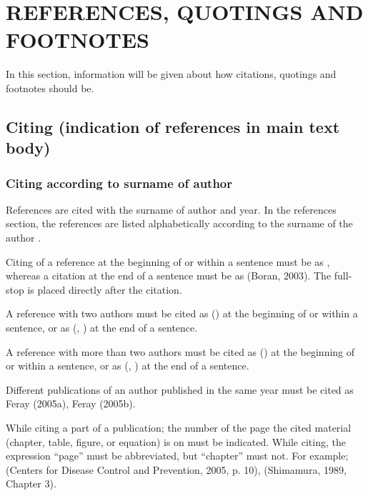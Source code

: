 \chapter{REFERENCES, QUOTINGS AND FOOTNOTES}\label{ch:ch4}

In this section, information will be given about how citations, quotings and footnotes should be.

\section{Citing (indication of references in main text body)}

\vspace{-12pt}

\subsection{Citing according to surname of author}

References are cited with the surname of author and year. In the references section, the references are listed alphabetically according to the surname of the author \citep{acar97}.

Citing of a reference at the beginning of or within a sentence must be as \citet{harper2007}, whereas a citation at the end of a sentence must be as (Boran, 2003). The full-stop is placed directly after the citation. 

A reference with two authors must be cited as \citeauthor{mccaffrey88} (\citeyear{mccaffrey88}) at the beginning of or within a sentence, or as (\citeauthor{mccaffrey88}, \citeyear{mccaffrey88}) at the end of a sentence. 

A reference with more than two authors must be cited as \citeauthor{vanden2001} (\citeyear{vanden2001}) at the beginning of or within a sentence, or as (\citeauthor{vanden2001}, \citeyear{vanden2001}) at the end of a sentence. 

Different publications of an author published in the same year must be cited as Feray (2005a), Feray (2005b).

While citing a part of a publication; the number of the page the cited material (chapter, table, figure, or equation) is on must be indicated. While citing, the expression “page” must be abbreviated, but “chapter” must not. For example; (Centers for Disease Control and Prevention, 2005, p. 10), (Shimamura, 1989, Chapter 3). 

